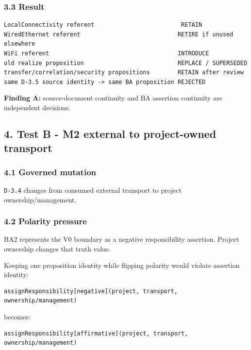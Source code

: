 \documentclass[11pt,a4paper]{article}
\begin{document}
\subsubsection{3.3 Result}\label{result}

\begin{verbatim}
LocalConnectivity referent                         RETAIN
WiredEthernet referent                            RETIRE if unused elsewhere
WiFi referent                                     INTRODUCE
old realize proposition                           REPLACE / SUPERSEDED
transfer/correlation/security propositions        RETAIN after review
same D-3.5 source identity -> same BA proposition REJECTED
\end{verbatim}

\textbf{Finding A:} source-document continuity and BA assertion
continuity are independent decisions.

\subsection{4. Test B - M2 external to project-owned
transport}\label{test-b---m2-external-to-project-owned-transport}

\subsubsection{4.1 Governed mutation}\label{governed-mutation-1}

\texttt{D-3.4} changes from consumed external transport to project
ownership/management.

\subsubsection{4.2 Polarity pressure}\label{polarity-pressure}

BA2 represents the V0 boundary as a negative responsibility assertion.
Project ownership changes that truth value.

Keeping one proposition identity while flipping polarity would violate
assertion identity:

\begin{verbatim}
assignResponsibility[negative](project, transport, ownership/management)
\end{verbatim}

becomes:

\begin{verbatim}
assignResponsibility[affirmative](project, transport, ownership/management)
\end{verbatim}
\end{document}

